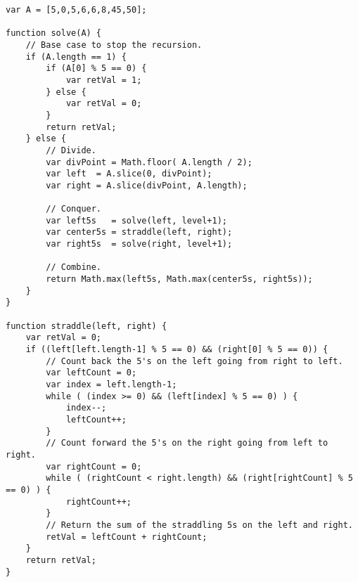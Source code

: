 \documentclass[letterpaper, 10pt,DIV=13]{scrartcl}
\numberwithin{equation}{section} %
\numberwithin{figure}{section} %
\numberwithin{table}{section} %
\begin{document}
\lstset{numbers=left, numberstyle=\tiny, stepnumber=1, numbersep=5pt, basicstyle=\footnotesize\ttfamily}
\begin{lstlisting}[frame=single, ]  
var A = [5,0,5,6,6,8,45,50];

function solve(A) {
    // Base case to stop the recursion.
    if (A.length == 1) {
        if (A[0] % 5 == 0) {
            var retVal = 1;
        } else {
            var retVal = 0;
        }
        return retVal;
    } else {
        // Divide.
        var divPoint = Math.floor( A.length / 2);
        var left  = A.slice(0, divPoint);
        var right = A.slice(divPoint, A.length);
        
        // Conquer.
        var left5s   = solve(left, level+1);
        var center5s = straddle(left, right);
        var right5s  = solve(right, level+1);             
        
        // Combine.
        return Math.max(left5s, Math.max(center5s, right5s));
    }
}

function straddle(left, right) {
    var retVal = 0;
    if ((left[left.length-1] % 5 == 0) && (right[0] % 5 == 0)) {
        // Count back the 5's on the left going from right to left.
        var leftCount = 0;
        var index = left.length-1;
        while ( (index >= 0) && (left[index] % 5 == 0) ) {
            index--;
            leftCount++;
        }
        // Count forward the 5's on the right going from left to right.
        var rightCount = 0;
        while ( (rightCount < right.length) && (right[rightCount] % 5 == 0) ) {
            rightCount++;
        }
        // Return the sum of the straddling 5s on the left and right.
        retVal = leftCount + rightCount;
    }
    return retVal;
}
\end{lstlisting}
\end{document}
